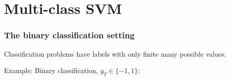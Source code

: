 \section{Multi-class SVM}


\begin{frame}\frametitle{The binary classification setting}


Classification problems have labels with only finite many possible values.

Example: Binary classification, $y_{T} \in \{-1,1\}$:


\end{frame}
